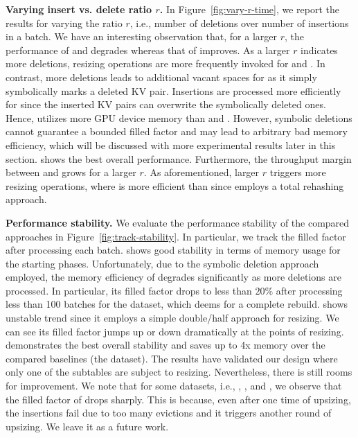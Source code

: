 \noindent\textbf{Varying insert vs. delete ratio $r$.}
In Figure~\ref{fig:vary-r-time}, we report the results for varying the ratio $r$, i.e., number of deletions over number of insertions in a batch.
We have an interesting observation that, for a larger $r$, the performance of \voter and \megakv degrades whereas that of \slab improves. As a larger $r$ indicates more deletions, resizing operations are more frequently invoked for \voter and \megakv. In contrast, more deletions leads to additional vacant spaces for \slab as it simply symbolically marks a deleted KV pair. Insertions are processed more efficiently for \slab since the inserted KV pairs can overwrite the symbolically deleted ones. Hence, \slab utilizes more GPU device memory than \voter and \megakv. However, symbolic deletions cannot guarantee a bounded filled factor and may lead to arbitrary bad memory efficiency, which will be discussed with more experimental results later in this section.
\voter shows the best overall performance. Furthermore, the throughput margin between \voter and \megakv grows for a larger $r$. 
As aforementioned, larger $r$ triggers more resizing operations, where \voter is more efficient than \megakv since \megakv employs a total rehashing approach. 



\vspace{1mm}\noindent\textbf{Performance stability.}
We evaluate the performance stability of the compared approaches in Figure~\ref{fig:track-stability}. 
In particular, we track the filled factor after processing each batch.
\slab shows good stability in terms of memory usage for the starting phases. Unfortunately, due to the symbolic deletion approach employed, the memory efficiency of \slab degrades significantly as more deletions are processed. In particular, its filled factor drops to less than $20\%$ after processing less than 100 batches for the \dsali dataset, which deems for a complete rebuild.
%
\megakv shows unstable trend since it employs a simple double/half approach for resizing. We can see its filled factor jumps up or down dramatically at the points of resizing. \voter demonstrates the best overall stability and saves up to 4x memory over the compared baselines (the \dsali dataset). 
The results have validated our design where only one of the subtables are subject to resizing. 
Nevertheless, there is still rooms for improvement. We note that for some datasets, i.e., \dstwitter, \dsreddit, \dstpch and \dsrandom, we observe that the filled factor of \voter drops sharply.
This is because, even after one time of upsizing, the insertions fail due to too many evictions and it triggers another round of upsizing. We leave it as a future work. 


